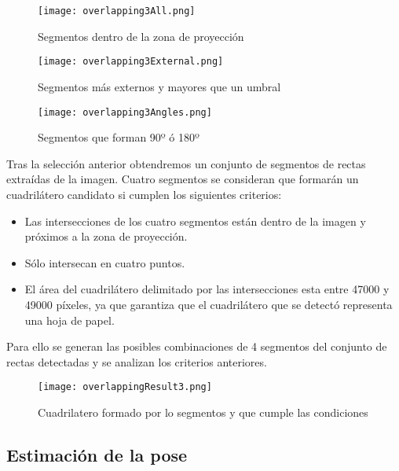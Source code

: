\begin{figure} 
    \centering
    \texttt{[image: overlapping3All.png]}
    \caption{Segmentos dentro de la zona de proyección}
    \label{fig:overlappingAll}
  \end{figure}
  
 \begin{figure} 
    \centering
    \texttt{[image: overlapping3External.png]}
    \caption{Segmentos más externos y mayores que un umbral}
    \label{fig:overlappingExt}
  \end{figure}

  \begin{figure} 
    \centering
    \texttt{[image: overlapping3Angles.png]}
    \caption{Segmentos que forman 90º ó 180º}
    \label{fig:overlappingAngles}
  \end{figure}

Tras la selección anterior obtendremos un conjunto de segmentos de rectas extraídas de la imagen. Cuatro segmentos se consideran que formarán un cuadrilátero candidato si cumplen los siguientes criterios:

\begin{itemize}
\item Las intersecciones de los cuatro segmentos están dentro de la imagen y próximos a la zona de
  proyección.
\item Sólo intersecan en cuatro puntos.
\item El área del cuadrilátero delimitado por las intersecciones esta entre 47000 y 49000 píxeles, ya que garantiza que el cuadrilátero que se detectó representa una hoja de papel.
\end{itemize}

Para ello se generan las posibles combinaciones de 4 segmentos del conjunto de rectas detectadas y se analizan los criterios anteriores.
\begin{figure}[h!] 
    \centering
    \texttt{[image: overlappingResult3.png]}
    \caption{Cuadrilatero formado por lo segmentos y que cumple las condiciones}
    \label{fig:overlappingResult}
  \end{figure}


\subsection{Estimación de la pose}

